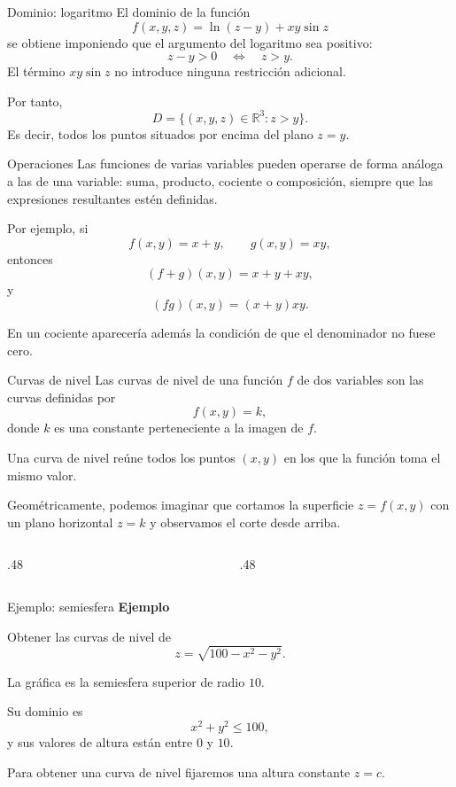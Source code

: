 \begin{frame}{Dominio: logaritmo}
El dominio de la función
\[
f(x,y,z)=\ln(z-y)+xy\sin z
\]
se obtiene imponiendo que el argumento del logaritmo sea positivo:
\[
z-y>0
\quad\Longleftrightarrow\quad
z>y.
\]
El término $xy\sin z$ no introduce ninguna restricción adicional.
\medskip

Por tanto,
\[
D=\{(x,y,z)\in\mathbb{R}^3:z>y\}.
\]
Es decir, todos los puntos situados por encima del plano $z=y$.
\end{frame}

\begin{frame}{Operaciones}
Las funciones de varias variables pueden operarse de forma análoga a las de una variable: suma, producto, cociente o composición, siempre que las expresiones resultantes estén definidas.
\medskip

Por ejemplo, si
\[
f(x,y)=x+y,
\qquad
g(x,y)=xy,
\]
entonces
\[
(f+g)(x,y)=x+y+xy,
\]
y
\[
(fg)(x,y)=(x+y)xy.
\]
\smallskip

En un cociente aparecería además la condición de que el denominador no fuese cero.
\end{frame}

\begin{frame}{Curvas de nivel}
Las curvas de nivel de una función $f$ de dos variables son las curvas definidas por
\[
f(x,y)=k,
\]
donde $k$ es una constante perteneciente a la imagen de $f$.
\medskip

Una curva de nivel reúne todos los puntos $(x,y)$ en los que la función toma el mismo valor.
\medskip

Geométricamente, podemos imaginar que cortamos la superficie $z=f(x,y)$ con un plano horizontal $z=k$ y observamos el corte desde arriba.
\begin{columns}[c]
\begin{column}{.48\textwidth}\end{column}
\begin{column}{.48\textwidth}\end{column}
\end{columns}
\end{frame}

\begin{frame}{Ejemplo: semiesfera}
\textbf{Ejemplo}
\medskip

Obtener las curvas de nivel de
\[
z=\sqrt{100-x^2-y^2}.
\]
\medskip

La gráfica es la semiesfera superior de radio $10$.
\medskip

Su dominio es
\[
x^2+y^2\leq 100,
\]
y sus valores de altura están entre $0$ y $10$.
\medskip

Para obtener una curva de nivel fijaremos una altura constante $z=c$.
\end{frame}

